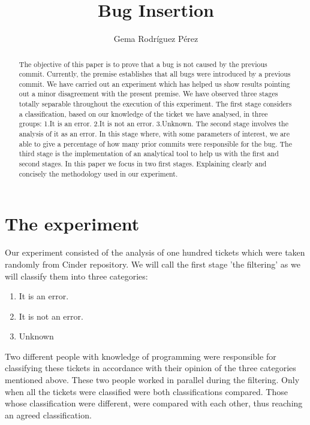 \documentclass[a4paper]{article}
\title{Bug Insertion}
\author{Gema Rodríguez Pérez}
\date{}
\begin{document}
\maketitle

\begin{abstract}
The objective of this paper is to prove that a bug is not caused by the previous commit. Currently, the premise establishes that all bugs were introduced by a previous commit. We have carried out an experiment which has helped us show results pointing out a minor disagreement with the present premise. We have observed three stages totally separable throughout the execution of this experiment. The first stage considers a classification, based on our knowledge of the ticket we have analysed, in three groups:
 1.It is an error. 
 2.It is not an error. 
 3.Unknown. 
  The second stage involves the analysis of it as an error. In this stage where, with some parameters of interest, we are able to give a percentage of how many prior commits were responsible for the bug. 
The third stage is the implementation of an analytical tool to help us with the first and second stages. 
In this paper we focus in two first stages. Explaining clearly and concisely the methodology used in our experiment. 

\end{abstract}

\section{The experiment}

Our experiment consisted of the analysis of one hundred tickets which were taken randomly from Cinder repository. We will call the first stage 'the filtering' as we will classify them into three categories: 

\begin{enumerate}
    \item It is an error.
    \item It is not an error.
    \item Unknown
\end{enumerate}

Two different people with knowledge of programming were responsible for classifying these tickets in accordance with their opinion of the three categories mentioned above. These two people worked in parallel during the filtering. Only when all the tickets were classified were both classifications compared. Those whose classification were different, were compared with each other, thus reaching an agreed classification. 
\end{document}
